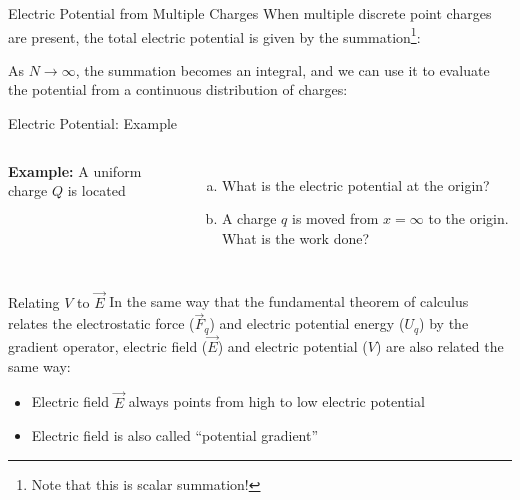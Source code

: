 \documentclass[12pt,aspectratio=169]{beamer}
\begin{document}
\begin{frame}{Electric Potential from Multiple Charges}
  When multiple discrete point charges are present, the total electric
  potential is given by the summation\footnote{Note that this is scalar
  summation!}:


  As $N\rightarrow\infty$, the summation becomes an integral, and we can use it
  to evaluate the potential from a continuous distribution of charges:

  \vspace{.3in}
\end{frame}




\begin{frame}{Electric Potential: Example}
  \begin{columns}
    
    \textbf{Example:} A uniform charge $Q$ is located

    \begin{enumerate}[(a)]
    \item What is the electric potential at the origin?
    \item A charge $q$ is moved from $x=\infty$ to the origin. What is the
      work done?
    \end{enumerate}
  \end{columns}
\end{frame}



\begin{frame}{Relating $V$ to $\vec E$}
  In the same way that the fundamental theorem of calculus relates the 
  electrostatic force ($\vec F_q$) and electric potential energy ($U_q$) by the
  gradient operator, electric field ($\vec E$) and electric potential ($V$) are
  also related the same way:

  \begin{itemize}
  \item Electric field $\vec E$ always points from high to low electric
    potential
  \item Electric field is also called ``potential gradient''
  \end{itemize}
\end{frame}
\end{document}
